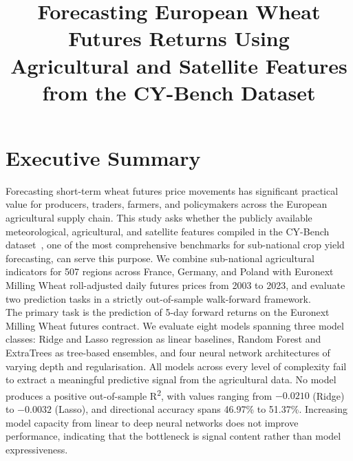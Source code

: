 \documentclass[pdflatex,sn-mathphys-num, oneside, 11pt]{sn-jnl}%
\theoremstyle{thmstyleone}%
\theoremstyle{thmstyletwo}%
\theoremstyle{thmstylethree}%
\begin{document}
\title[Article Title]{Forecasting European Wheat Futures Returns Using Agricultural and Satellite Features from the CY-Bench Dataset}


\author{}
\author{}
\author{}



\maketitle

\clearpage

\section{Executive Summary}\label{execsum}

Forecasting short-term wheat futures price movements has significant
practical value for producers, traders, farmers, and policymakers across
the European agricultural supply chain. This study asks whether the
publicly available meteorological, agricultural, and satellite features
compiled in the CY-Bench dataset~\cite{bib17}, one of the most
comprehensive benchmarks for sub-national crop yield forecasting, can
serve this purpose. We combine sub-national agricultural indicators for
507 regions across France, Germany, and Poland with Euronext Milling
Wheat roll-adjusted daily futures prices from 2003 to 2023, and evaluate
two prediction tasks in a strictly out-of-sample walk-forward
framework.\\

The primary task is the prediction of 5-day forward returns on the Euronext Milling Wheat futures contract. We evaluate eight models spanning three model classes: Ridge and Lasso regression as linear baselines, Random Forest and ExtraTrees as tree-based ensembles, and four neural network architectures of varying depth and regularisation. All models across every level of complexity fail to extract a meaningful predictive signal from the agricultural data. No model produces a positive out-of-sample R\textsuperscript{2}, with values ranging from $-0.0210$ (Ridge) to $-0.0032$ (Lasso), and directional accuracy spans 46.97\% to 51.37\%. Increasing model capacity from linear to deep neural networks does not improve performance, indicating that the bottleneck is signal content rather than model expressiveness.\\
\end{document}
